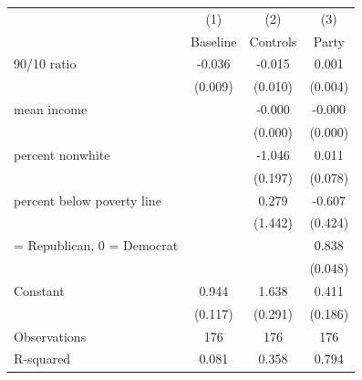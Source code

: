 \begin{tabular}{lccc}
\toprule
                    &\multicolumn{1}{c}{(1)}&\multicolumn{1}{c}{(2)}&\multicolumn{1}{c}{(3)}\\
                    &\multicolumn{1}{c}{Baseline}&\multicolumn{1}{c}{Controls}&\multicolumn{1}{c}{Party}\\
\midrule
90/10 ratio         &      -0.036\sym{***}&      -0.015         &       0.001         \\
                    &     (0.009)         &     (0.010)         &     (0.004)         \\
\addlinespace
mean income         &                     &      -0.000\sym{***}&      -0.000\sym{**} \\
                    &                     &     (0.000)         &     (0.000)         \\
\addlinespace
percent nonwhite    &                     &      -1.046\sym{***}&       0.011         \\
                    &                     &     (0.197)         &     (0.078)         \\
\addlinespace
percent below poverty line&                     &       0.279         &      -0.607         \\
                    &                     &     (1.442)         &     (0.424)         \\
\addlinespace
1 = Republican, 0 = Democrat&                     &                     &       0.838\sym{***}\\
                    &                     &                     &     (0.048)         \\
\addlinespace
Constant            &       0.944\sym{***}&       1.638\sym{***}&       0.411\sym{**} \\
                    &     (0.117)         &     (0.291)         &     (0.186)         \\
\midrule
Observations        &         176         &         176         &         176         \\
R-squared           &       0.081         &       0.358         &       0.794         \\
\bottomrule
\end{tabular}
